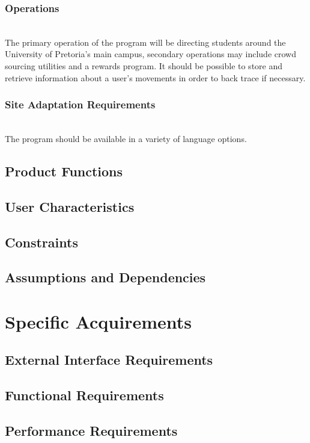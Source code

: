 \documentclass[a4paper,10pt]{article}
\begin{document}
		\subsubsection{Operations}
			\\The primary operation of the program will be directing students around the University of Pretoria’s main 				campus, secondary operations may include crowd sourcing utilities and a rewards program. It should be possible 				to store and retrieve information about a user’s movements in order to back trace if necessary.\\
		\subsubsection{Site Adaptation Requirements}
			\\The program should be available in a variety of language options.\\
		
	\subsection{Product Functions}
	\subsection{User Characteristics}
	\subsection{Constraints}
	\subsection{Assumptions and Dependencies}

\section{Specific Acquirements}

	\subsection{External Interface Requirements}
	\subsection{Functional Requirements}
	\subsection{Performance Requirements}
\end{document}

